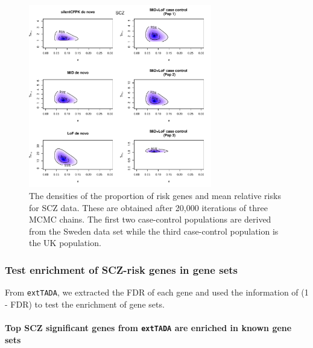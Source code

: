 \documentclass[]{article}
\begin{document}
\begin{figure}[H]
\includegraphics[width=\textwidth,height=8cm]{Picture/HeatMapPostDensitySCZ_combinedCC.pdf}
\caption{The densities of the proportion of risk genes
  and mean relative risks for SCZ data. These are obtained after
  20,000 iterations of three MCMC chains. The first two case-control populations are
  derived from the Sweden data set while the third case-control
  population is the UK population.}
\label{fig:heatmapSCZ}
\end{figure}

\subsubsection{Test enrichment of SCZ-risk genes in gene sets}

From \texttt{extTADA}, we extracted the FDR of each gene and used the information of (1 - FDR) to test the enrichment of gene sets.

\paragraph{Top SCZ significant genes from \texttt{extTADA} are enriched
  in known gene sets}
\end{document}

